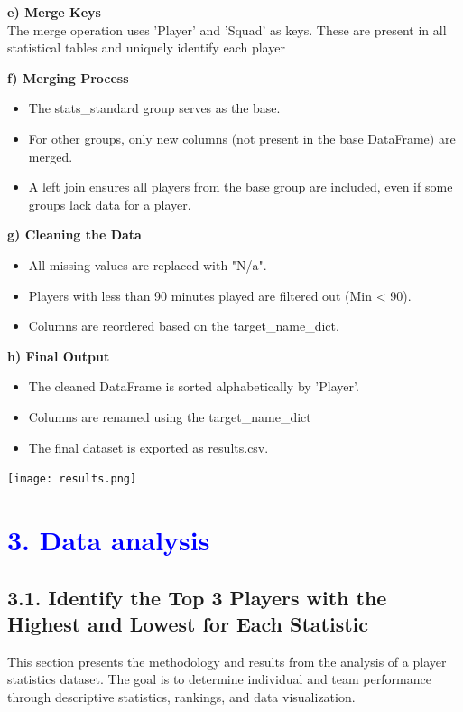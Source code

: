 \documentclass[a4paper,12pt]{article}
\begin{document}
\vspace{1em}
\textbf{e) Merge Keys}\\
The merge operation uses 'Player' and 'Squad' as keys. These are present in all statistical tables and uniquely identify each player

\vspace{1em}
\textbf{ f) Merging Process}
\vspace{-10pt}
\begin{itemize}
    \item The stats\_standard group serves as the base.
    \item For other groups, only new columns (not present in the base DataFrame) are merged.
    \item A left join ensures all players from the base group are included, even if some groups lack data for a player.
\end{itemize}

\vspace{1em}
\textbf{g) Cleaning the Data}
\vspace{-10pt}
\begin{itemize}
    \item All missing values are replaced with "N/a".
    \item Players with less than 90 minutes played are filtered out (Min < 90).
    \item Columns are reordered based on the target\_name\_dict.
\end{itemize}
\newpage
\textbf{h) Final Output} 
\vspace{-10pt}
\begin{itemize}
    \item The cleaned DataFrame is sorted alphabetically by 'Player'.
    \item Columns are renamed using the target\_name\_dict
    \item The final dataset is exported as results.csv.
\end{itemize}
\texttt{[image: results.png]}
\newpage
\section*{\textcolor{blue}{\Large 3. Data analysis}}
\subsection*{\textbf{\large 3.1. Identify the Top 3 Players with the Highest and Lowest for Each Statistic}}
\vspace{-10pt}
This section presents the methodology and results from the analysis of a player statistics dataset. The goal is to determine individual and team performance through descriptive statistics, rankings, and data visualization.
\end{document}
